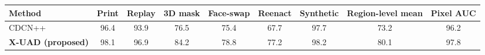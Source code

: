 \begin{tabular}{lcccccccc}
\toprule
Method & Print & Replay & 3D mask & Face-swap & Reenact & Synthetic & Region-level mean & Pixel AUC \\
\midrule
CDCN++~\cite{yu2020cdcn} & 96.4 & 93.9 & 76.5 & 75.4 & 67.7 & 97.7 & 73.2 & 96.2 \\
\textbf{X-UAD (proposed)} & 98.1 & 96.9 & 84.2 & 78.8 & 77.2 & 98.2 & 80.1 & 97.8 \\
\bottomrule
\end{tabular}